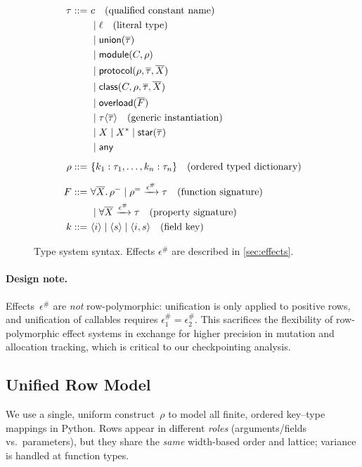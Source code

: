 \begin{figure}[t]
\centering
\begin{align*}
\tau ::=~& c \quad\text{(qualified constant name)} \\
 & \mid \ell \quad\text{(literal type)} \\
 & \mid \mathsf{union}(\overline{\tau}) \\
 & \mid \mathsf{module}(C, \mathord{\rho}) \\
 & \mid \mathsf{protocol}(\mathord{\rho}, \overline{\tau}, \overline{X}) \\
 & \mid \mathsf{class}(C, \mathord{\rho}, \overline{\tau}, \overline{X}) \\
 & \mid \mathsf{overload}(\overline{F}) \\
 & \mid \tau\langle\overline{\tau}\rangle \quad\text{(generic instantiation)} \\
 & \mid X \mid X^* \mid \mathsf{star}(\overline{\tau}) \\
 & \mid \mathsf{any}
\\[0.5em]
\mathord{\rho} ::=~& \{ k_1 : \tau_1, \ldots, k_n : \tau_n \} \quad\text{(ordered typed dictionary)}
\\[0.5em]
F ::=~& \forall \overline{X}.\,\mathord{\rho^{-}} \mid \mathord{\rho^{=}} \xrightarrow{\epsilon^\#} \tau
\quad\text{(function signature)}\\
 & \mid \forall \overline{X}\xrightarrow{\epsilon^\#} \tau \quad\text{(property signature)}
\\
k ::=~& \langle i\rangle \mid \langle s\rangle \mid \langle i, s\rangle
\quad\text{(field key)}
\end{align*}
\caption{Type system syntax. Effects $\epsilon^\#$ are described in \autoref{sec:effects}.}
\label{fig:type-syntax}
\end{figure}

\paragraph{Design note.}
Effects~$\epsilon^\#$ are \emph{not} row-polymorphic: unification is only applied to positive rows, and unification of callables requires $\epsilon^\#_1 = \epsilon^\#_2$.  
This sacrifices the flexibility of row-polymorphic effect systems in exchange for higher precision in mutation and allocation tracking, which is critical to our checkpointing analysis.

\subsection{Unified Row Model}
\label{sec:unified-record}
We use a single, uniform construct~$\rho$ to model all finite, ordered key--type mappings in Python.
Rows appear in different \emph{roles} (arguments/fields vs.\ parameters), but they share the \emph{same} width-based order and lattice; variance is handled at function types.



